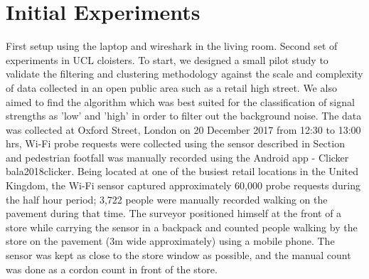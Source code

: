 \section{Initial Experiments}

First setup using the laptop and wireshark in the living room.
Second set of experiments in UCL cloisters.
To start, we designed a small pilot study to validate the filtering and clustering methodology against the scale and complexity of data collected in an open public area such as a retail high street.
We also aimed to find the algorithm which was best suited for the classification of signal strengths as 'low' and 'high' in order to filter out the background noise.
The data was collected at Oxford Street, London on 20 December 2017 from 12:30 to 13:00 hrs, Wi-Fi probe requests were collected using the sensor described in Section and pedestrian footfall was manually recorded using the Android app - Clicker bala2018clicker.
Being located at one of the busiest retail locations in the United Kingdom, the Wi-Fi sensor captured approximately 60,000 probe requests during the half hour period; 3,722 people were manually recorded walking on the pavement during that time.
The surveyor positioned himself at the front of a store while carrying the sensor in a backpack and counted people walking by the store on the pavement (3m wide approximately) using a mobile phone.
The sensor was kept as close to the store window as possible, and the manual count was done as a cordon count in front of the store.


